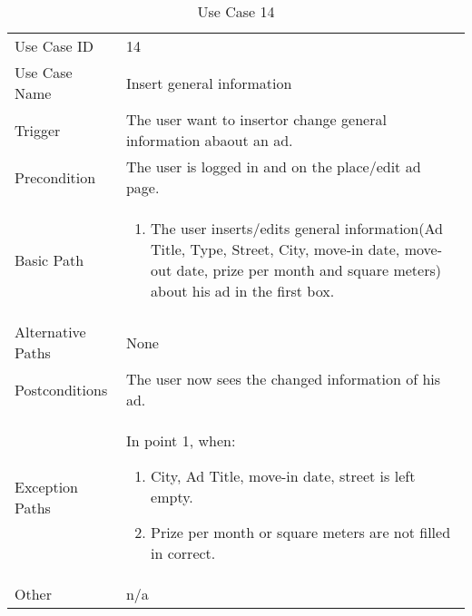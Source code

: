 \begin{table}[H]
\centering
\label{table-use-case-14}
\begin{tabular}{|p{3cm}|p{10cm}}
Use Case ID       & 14                                                      \\
Use Case Name     & Insert general information                            \\
Trigger           & The user want to insertor change general information abaout
an ad.
\\
Precondition      & The user is logged in and on the place/edit ad page.           
\\
Basic Path        & \begin{enumerate}
\item		The user inserts/edits general information(Ad Title, Type, Street, City,
move-in date, move-out date, prize per month and square meters) about his ad in
the first box.
\end{enumerate} \\
Alternative Paths & None                          \\
Postconditions    & The user now sees the changed information of his ad.	\\
Exception Paths   & In point 1, when: \begin{enumerate}
  \item 		City, Ad Title, move-in date, street is left empty.
  \item			Prize per month or square meters are not filled in correct.
\end{enumerate}			\\
Other             & n/a                                                                                                                                                                                                        
\end{tabular}
\caption{Use Case 14}
\end{table}

